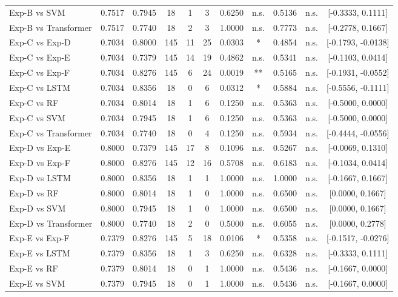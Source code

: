 \begin{table}[htbp]
{\begin{tabular}{l cc c cc cc cc c}
  Exp-B vs SVM & 0.7517 & 0.7945 & 18 & 1 & 3 & 0.6250 & n.s. & 0.5136 & n.s. & [-0.3333, 0.1111] \\
  Exp-B vs Transformer & 0.7517 & 0.7740 & 18 & 2 & 3 & 1.0000 & n.s. & 0.7773 & n.s. & [-0.2778, 0.1667] \\
  Exp-C vs Exp-D & 0.7034 & 0.8000 & 145 & 11 & 25 & 0.0303 & * & 0.4854 & n.s. & [-0.1793, -0.0138] \\
  Exp-C vs Exp-E & 0.7034 & 0.7379 & 145 & 14 & 19 & 0.4862 & n.s. & 0.5341 & n.s. & [-0.1103, 0.0414] \\
  Exp-C vs Exp-F & 0.7034 & 0.8276 & 145 & 6 & 24 & 0.0019 & ** & 0.5165 & n.s. & [-0.1931, -0.0552] \\
  Exp-C vs LSTM & 0.7034 & 0.8356 & 18 & 0 & 6 & 0.0312 & * & 0.5884 & n.s. & [-0.5556, -0.1111] \\
  Exp-C vs RF & 0.7034 & 0.8014 & 18 & 1 & 6 & 0.1250 & n.s. & 0.5363 & n.s. & [-0.5000, 0.0000] \\
  Exp-C vs SVM & 0.7034 & 0.7945 & 18 & 1 & 6 & 0.1250 & n.s. & 0.5363 & n.s. & [-0.5000, 0.0000] \\
  Exp-C vs Transformer & 0.7034 & 0.7740 & 18 & 0 & 4 & 0.1250 & n.s. & 0.5934 & n.s. & [-0.4444, -0.0556] \\
  Exp-D vs Exp-E & 0.8000 & 0.7379 & 145 & 17 & 8 & 0.1096 & n.s. & 0.5267 & n.s. & [-0.0069, 0.1310] \\
  Exp-D vs Exp-F & 0.8000 & 0.8276 & 145 & 12 & 16 & 0.5708 & n.s. & 0.6183 & n.s. & [-0.1034, 0.0414] \\
  Exp-D vs LSTM & 0.8000 & 0.8356 & 18 & 1 & 1 & 1.0000 & n.s. & 1.0000 & n.s. & [-0.1667, 0.1667] \\
  Exp-D vs RF & 0.8000 & 0.8014 & 18 & 1 & 0 & 1.0000 & n.s. & 0.6500 & n.s. & [0.0000, 0.1667] \\
  Exp-D vs SVM & 0.8000 & 0.7945 & 18 & 1 & 0 & 1.0000 & n.s. & 0.6500 & n.s. & [0.0000, 0.1667] \\
  Exp-D vs Transformer & 0.8000 & 0.7740 & 18 & 2 & 0 & 0.5000 & n.s. & 0.6055 & n.s. & [0.0000, 0.2778] \\
  Exp-E vs Exp-F & 0.7379 & 0.8276 & 145 & 5 & 18 & 0.0106 & * & 0.5358 & n.s. & [-0.1517, -0.0276] \\
  Exp-E vs LSTM & 0.7379 & 0.8356 & 18 & 1 & 3 & 0.6250 & n.s. & 0.6328 & n.s. & [-0.3333, 0.1111] \\
  Exp-E vs RF & 0.7379 & 0.8014 & 18 & 0 & 1 & 1.0000 & n.s. & 0.5436 & n.s. & [-0.1667, 0.0000] \\
  Exp-E vs SVM & 0.7379 & 0.7945 & 18 & 0 & 1 & 1.0000 & n.s. & 0.5436 & n.s. & [-0.1667, 0.0000] \\

\end{tabular}}
\end{table}

